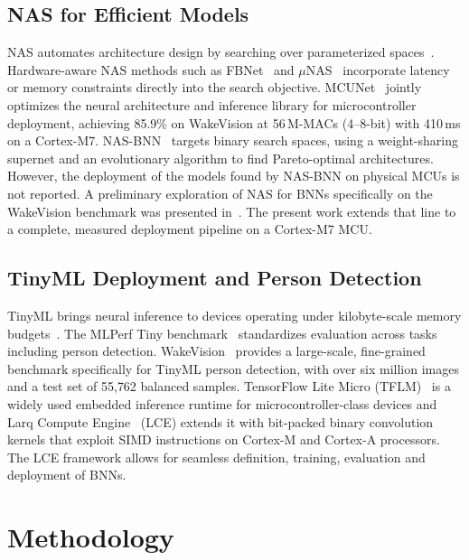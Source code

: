 \documentclass[conference]{IEEEtran}
\begin{document}
\subsection{NAS for Efficient Models}

NAS automates architecture design by searching over parameterized spaces~\cite{baymurzina2022review}.
Hardware-aware NAS methods such as FBNet~\cite{wu2019fbnet} and $\mu$NAS~\cite{liberis2021munas} incorporate latency or memory constraints directly into the search objective.
MCUNet~\cite{lin2020mcunet} jointly optimizes the neural architecture and inference library for microcontroller deployment, achieving 85.9\% on WakeVision at 56\,M-MACs (4--8-bit) with 410\,ms on a Cortex-M7.
NAS-BNN~\cite{lin2025nasbnn} targets binary search spaces, using a weight-sharing supernet and an evolutionary algorithm to find Pareto-optimal architectures. However, the deployment of the models found by NAS-BNN on physical MCUs is not reported.
A preliminary exploration of NAS for BNNs specifically on the WakeVision benchmark was presented in~\cite{pighetti2024exploring}. The present work extends that line to a complete, measured deployment pipeline on a Cortex-M7 MCU.

\subsection{TinyML Deployment and Person Detection}

TinyML brings neural inference to devices operating under kilobyte-scale memory budgets~\cite{banbury2021micronets, mittal2024comprehensive}.
The MLPerf Tiny benchmark~\cite{banbury2021mlperftiny} standardizes evaluation across tasks including person detection.
WakeVision~\cite{banbury2025wakevision} provides a large-scale, fine-grained benchmark specifically for TinyML person detection, with over six million images and a test set of 55{,}762 balanced samples.
TensorFlow Lite Micro (TFLM)~\cite{david2021tflitemicro} is a widely used embedded inference runtime for microcontroller-class devices and Larq Compute Engine~\cite{bannink2021larq} (LCE) extends it with bit-packed binary convolution kernels that exploit SIMD instructions on Cortex-M and Cortex-A processors. The LCE framework allows for seamless definition, training, evaluation and deployment of BNNs.
\section{Methodology}
\label{sec:method}
\end{document}
